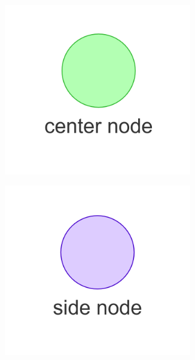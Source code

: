 \begin{figure}[H]
    \centering
    \begin{subfigure}{0.3\textwidth}
    \centering
    \includegraphics[width=0.9\textwidth]{figures/proposed_method/center_node}
    \caption{}%
    \end{subfigure}
    \begin{subfigure}{0.3\textwidth}
    \centering
    \includegraphics[width=0.9\textwidth]{figures/proposed_method/side_node}
    \caption{}%
    \end{subfigure}
    \begin{subfigure}{0.3\textwidth}

\end{subfigure}
\end{figure}
